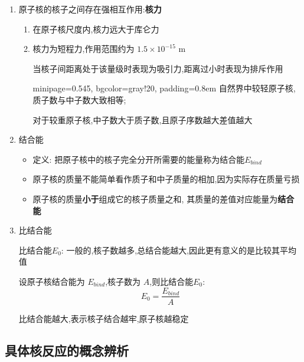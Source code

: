 \documentclass{article}
\begin{document}
\begin{enumerate}
    \item 原子核的核子之间存在强相互作用:\textbf{核力}
          \begin{enumerate}[label = (\alph*)]
              \item 在原子核尺度内,核力远大于库仑力
              \item 核力为短程力,作用范围约为 $1.5\times10^{-15}\text{ m}$

                    当核子间距离处于该量级时表现为吸引力,距离过小时表现为排斥作用

                    \vspace{-1em}\hspace{-0.6em}\begin{adjustbox}{minipage=0.545\linewidth, bgcolor=gray!20, padding=0.8em}
                        \small
                        自然界中较轻原子核,质子数与中子数大致相等;

                        对于较重原子核,中子数大于质子数,且原子序数越大差值越大
                    \end{adjustbox}
          \end{enumerate}

    \item 结合能

          \begin{itemize}
              \item 定义: 把原子核中的核子完全分开所需要的能量称为结合能$E_{bind}$
              \item 原子核的质量不能简单看作质子和中子质量的相加,因为实际存在质量亏损
              \item 原子核的质量\textbf{小于}组成它的核子质量之和,
                    其质量的差值对应能量为\textbf{结合能}
          \end{itemize}

    \item 比结合能

          比结合能$E_{0}$: 一般的,核子数越多,总结合能越大,因此更有意义的是比较其平均值

          设原子核结合能为 $E_{bind}$,核子数为 $A$,则比结合能$E_{0}$:
          $$
              E_0 = \frac{E_{bind}}{A}
          $$

          比结合能越大,表示核子结合越牢,原子核越稳定
\end{enumerate}

\subsection{具体核反应的概念辨析}
\end{document}
